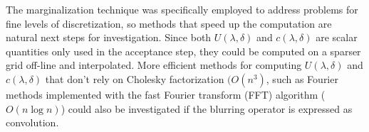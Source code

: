 \documentclass{article}
\begin{document}
The marginalization technique was specifically employed to address problems for fine levels of discretization, so methods that speed up the computation are natural next steps for investigation.
Since both $U(\lambda,\delta)$ and $c(\lambda,\delta)$ are scalar quantities only used in the acceptance step, they could be computed on a sparser grid  off-line and interpolated.  
More efficient methods for computing $U(\lambda,\delta)$ and $c(\lambda,\delta)$ that don't rely on Cholesky factorization $(O(n^3)$, such as Fourier methods implemented with the fast Fourier transform (FFT) algorithm ($O(n\log n)$) could also be investigated if the blurring operator is expressed as convolution.

\FloatBarrier
  
  
\end{document}
